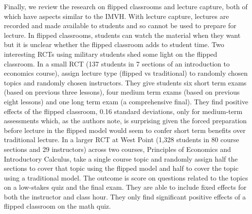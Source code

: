 \documentclass[12pt]{article}
\begin{document}
Finally, we review the research on flipped classrooms and lecture capture, both of which have aspects similar to the IMVH. With lecture capture, lectures are recorded and made available to students and so cannot be used to prepare for lecture. In flipped classrooms, students can watch the material when they want but it is unclear whether the flipped classroom adds to student time. Two interesting RCTs using military students shed some light on the flipped classroom. In a small RCT (137 students in 7 sections of an introduction to economics course), \textcite{wbi2018} assign lecture type (flipped vs traditional) to randomly chosen topics and randomly chosen instructors. They give students six short term exams (based on previous three lessons), four medium term exams (based on previous eight lessons) and one long term exam (a comprehensive final). They find positive effects of the flipped classroom, 0.16 standard deviations, only for medium-term assessments which, as the authors note, is surprising given the forced preparation before lecture in the flipped model would seem to confer short term benefits over traditional lecture. In a larger RCT at West Point (1,328 students in 80 course sections and 29 instructors) across two courses, Principles of Economics and Introductory Calculus, \textcite{sgmy2021} take a single course topic and randomly assign half the sections to cover that topic using the flipped model and half to cover the topic using a traditional model. The outcome is score on questions related to the topics on a low-stakes quiz and the final exam. They are able to include fixed effects for both the instructor and class hour. They only find significant positive effects of a flipped classroom on the math quiz.



\end{document}
